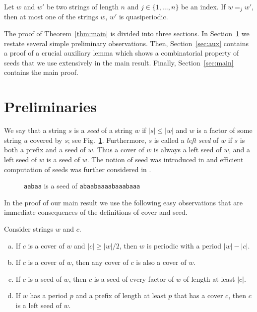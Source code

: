\documentclass{article}
\begin{document}
  \begin{theorem}\label{thm:main}
    Let $w$ and $w'$ be two strings of length $n$ and $j \in \{1,\ldots,n\}$ be an index.
    If $w =_j w'$, then at most one of the strings $w$, $w'$ is quasiperiodic.
  \end{theorem}

  The proof of Theorem~\ref{thm:main} is divided into three sections.
  In Section~\ref{sec:prelim} we restate several simple preliminary observations.
  Then, Section~\ref{sec:aux} contains a proof of a crucial auxiliary lemma which shows
  a combinatorial property of seeds that we use extensively in the main result.
  Finally, Section~\ref{sec:main} contains the main proof.

  \section{Preliminaries}\label{sec:prelim}
  We say that a string $s$ is
  a \emph{seed} of a string $w$ if $|s| \le |w|$ and $w$ is a factor of some string $u$ covered by $s$;
  see Fig.~\ref{fig:seed}.
  Furthermore, $s$ is called a \emph{left seed} of $w$ if $s$ is both a prefix and a seed of $w$.
  Thus a cover of $w$ is always a left seed of $w$, and a left seed of $w$ is a seed of $w$.
  The notion of seed was introduced in \cite{DBLP:journals/algorithmica/IliopoulosMP96}
  and efficient computation of seeds was further considered in \cite{DBLP:conf/cpm/ChristouCIKPRRSW11,DBLP:conf/soda/KociumakaKRRW12}.
    
    \begin{figure}[htpb]
    \begin{center}
    
    \end{center}
    \caption{
      \texttt{aabaa} is a seed of \texttt{abaabaaaabaaabaaa}
    }\label{fig:seed}
    \end{figure}

  In the proof of our main result we use the following easy observations that are immediate consequences
  of the definitions of cover and seed.


  \begin{observation}\label{obs}
    Consider strings $w$ and $c$.
    \begin{enumerate}[(a)]
      \item\label{obs:cover_period}
        If $c$ is a cover of $w$ and $|c| \ge |w|/2$, then $w$ is periodic with a period $|w|-|c|$.
      \item\label{obs:cover_cover}
        If $c$ is a cover of $w$, then any cover of $c$ is also a cover of $w$.
      \item\label{obs:trivial}
        If $c$ is a seed of $w$, then $c$ is a seed of every factor of $w$ of length at least $|c|$.
      \item\label{obs:extend}
        If $w$ has a period $p$ and a prefix of length at least $p$ that has a cover $c$,
        then $c$ is a left seed of $w$.
    \end{enumerate}
  \end{observation}
\end{document}

